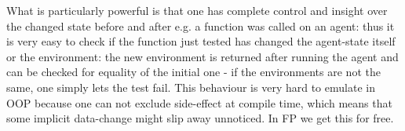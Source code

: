 What is particularly powerful is that one has complete control and insight over the changed state before and after e.g. a function was called on an agent: thus it is very easy to check if the function just tested has changed the agent-state itself or the environment: the new environment is returned after running the agent and can be checked for equality of the initial one - if the environments are not the same, one simply lets the test fail. This behaviour is very hard to emulate in OOP because one can not exclude side-effect at compile time, which means that some implicit data-change might slip away unnoticed. In FP we get this for free.
